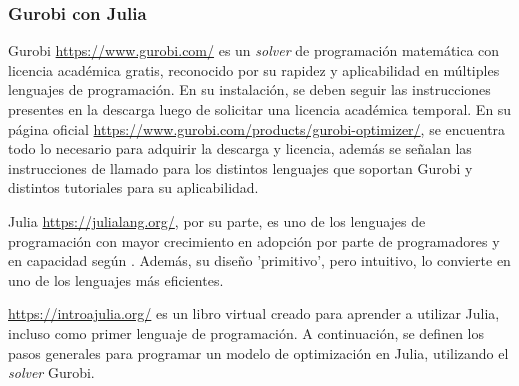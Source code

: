 \subsubsection{Gurobi con Julia}\label{mtjulia}

Gurobi \url{https://www.gurobi.com/} es un \textit{solver} de programación matemática con licencia académica gratis, reconocido por su rapidez y aplicabilidad en múltiples lenguajes de programación. En su instalación, se deben seguir las instrucciones presentes en la descarga luego de solicitar una licencia académica temporal. En su página oficial \url{https://www.gurobi.com/products/gurobi-optimizer/}, se encuentra todo lo necesario para adquirir la descarga y licencia, además se señalan las instrucciones de llamado para los distintos lenguajes que soportan Gurobi y distintos tutoriales para su aplicabilidad.
\vspace{2.5mm}

Julia \url{https://julialang.org/}, por su parte, es uno de los lenguajes de programación con mayor crecimiento en adopción por parte de programadores y en capacidad según \cite{noauthor_julia_2021}. Además, su diseño 'primitivo', pero intuitivo, lo convierte en uno de los lenguajes más eficientes. 
\vspace{2.5mm}

\url{https://introajulia.org/}  es un libro virtual creado para aprender a utilizar Julia, incluso como primer lenguaje de programación. A continuación, se definen los pasos generales para programar un modelo de optimización en Julia, utilizando el \textit{solver} Gurobi. 


